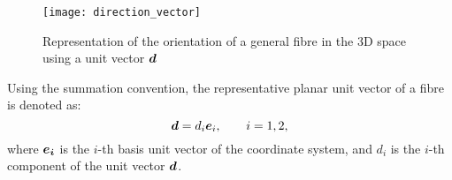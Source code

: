 \begin{figure}[!h]
\centering
%
%
%
%
%
%
%
%
%
%
%
 	\texttt{[image: direction\_vector]}
\caption{Representation of the orientation of a general fibre in the 3D space using a unit vector $\tena{d}$}\label{fig:vector5}
\end{figure}%
	
	Using the summation convention, the representative planar unit vector of a fibre is denoted as:
	\begin{equation}
	\tena{d}=d_i\tena{e}_i,\qquad i=1,2,
	\end{equation}
	where $\tena{e_i}$ is the $i$-th basis unit vector of the coordinate system, and  $d_i$ is the $i$-th component of the unit vector $\tena{d}$.

